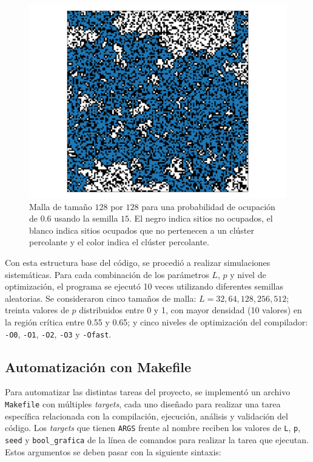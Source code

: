 \documentclass[%
 reprint,
 amsmath,amssymb,
 aps,
]{revtex4-2}
\begin{document}
\begin{figure}[H]
    \centering
    \includegraphics[width=1\linewidth]{malla.pdf}
    \caption{Malla de tamaño $128$ por $128$ para una probabilidad de ocupación de $0.6$ usando la semilla $15$. El negro indica sitios no ocupados, el blanco indica sitios ocupados que no pertenecen a un clúster percolante y el color indica el clúster percolante.}
    \label{fig:clúster}
\end{figure}

Con esta estructura base del código, se procedió a realizar simulaciones sistemáticas. Para cada combinación de los parámetros \( L \), \( p \) y nivel de optimización, el programa se ejecutó 10 veces utilizando diferentes semillas aleatorias. Se consideraron cinco tamaños de malla: \( L = 32, 64, 128, 256, 512 \); treinta valores de \( p \) distribuidos entre 0 y 1, con mayor densidad (10 valores) en la región crítica entre 0.55 y 0.65; y cinco niveles de optimización del compilador: \texttt{-O0}, \texttt{-O1}, \texttt{-O2}, \texttt{-O3} y \texttt{-Ofast}.

\subsection{Automatización con Makefile}

Para automatizar las distintas tareas del proyecto, se implementó un archivo \texttt{Makefile} con múltiples \textit{targets}, cada uno diseñado para realizar una tarea específica relacionada con la compilación, ejecución, análisis y validación del código. Los \textit{targets} que tienen \texttt{ARGS} frente al nombre reciben los valores de \texttt{L}, \texttt{p}, \texttt{seed} y \texttt{bool\_grafica} de la línea de comandos para realizar la tarea que ejecutan. Estos argumentos se deben pasar con la siguiente sintaxis:
\end{document}
